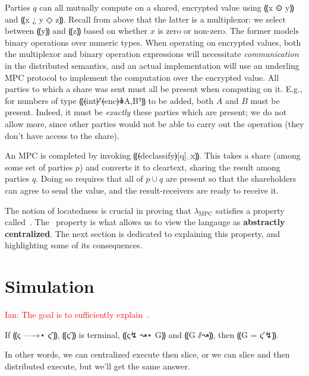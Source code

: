 \documentclass{report}
\newcommand{\mpc}{\ensuremath{\lambda_{\mathrm{MPC}}}\xspace}
\newcommand{\ins}[1]{\textcolor{red}{Ian: #1}}
\begin{document}
Parties $q$ can all mutually compute on a shared, encrypted value
using ⸨x ⊙ y⸩ and ⸨x ¿ y ◇ z⸩.  Recall from above that the latter is a
multiplexor: we select between ⸨y⸩ and ⸨z⸩ based on whether $x$ is zero or
non-zero. The former models binary operations over numeric types.
When operating on encrypted values, both the multiplexor and binary
operation expressions will necessitate \emph{communication} in the
distributed semantics, and an actual implementation will use an
underling MPC protocol to implement the computation over the encrypted value.
All parties to which a share was sent must
all be present when computing on it. E.g., for numbers of type
⸨⦑int⦒⸢⦑enc⦒⋕{A,B}⸣⸩ to be added, both $A$ and $B$ must be
present. Indeed, it must be \emph{exactly} these parties which are
present; we do not allow more, since other parties would not be
able to carry out the operation (they don't have access to the
share).

An MPC is completed by invoking ⸨⦑declassify⦒[q]␣x⸩. This takes a share
(among some set of parties $p$) and converts it to cleartext,
sharing the result among parties $q$. Doing so requires that all of
$p \cup q$ are present so that the shareholders
can agree to send the value, and the result-receivers are ready to
receive it.

The notion of locatedness is crucial in proving that \mpc satisfies
a property called~. The~
property is what allows us to view the langauge as \textbf{abstractly centralized}. The
next section is dedicated to explaining this property, and highlighting some of
its consequences.

\section{Simulation}
\label{sec:lam-mpc-simulation}

\ins{The goal is to sufficiently explain~\nameref{thm:mpc-simulation}.}

\begin{theorem} \label{thm:mpc-simulation}
  If ⸨ς —→⋆ ς′⸩, ⸨ς′⸩ is terminal, ⸨ς↯ ↝⋆ G⸩ and ⸨G ⫽↝⸩, then ⸨G = ς′↯⸩.
\end{theorem}

In other words, we can centralized execute then slice, or we can slice and then distributed execute, but we'll get the same answer.
\end{document}
